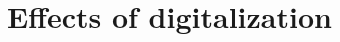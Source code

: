 \documentclass[a4]{scrartcl}
\begin{document}
	












	\section{Effects of digitalization} \label{sec:EffectsOfDigitalization}
	
	
\end{document}
